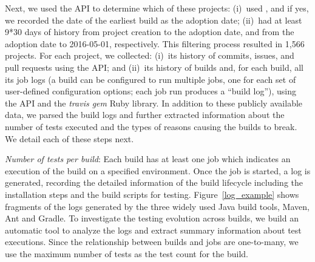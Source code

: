 
Next, we used the \Tvis API to determine which of these projects:
(i)~used \Tvis, and if yes, we recorded the date of the earliest build as the 
adoption date; (ii)~had at least 9*30 days of history from project creation to 
the adoption date, and from the adoption date to 2016-05-01, respectively. 
This filtering process resulted in 1,566 projects.
For each project, we collected: (i)~its history of commits, issues, and pull 
requests using the \GH API; and (ii)~its history of \Tvis builds and, for each
build, all its job logs (a \Tvis build can be configured to run multiple jobs,
one for each set of user-defined configuration options; each job run produces 
a ``build log''), using the \Tvis API and the \textit{travis gem} Ruby library.  
In addition to these publicly available data, we parsed the build logs and 
further extracted information about the number of tests executed and the 
types of reasons causing the builds to break.
We detail each of these steps next.



\emph{Number of tests per build}: 
Each build has at least one job which indicates an execution of the build on a specified environment. Once the job is started, a log is generated, recording the detailed information of the build lifecycle including the installation steps and the build scripts for testing. Figure~\ref{log_example} shows fragments of the logs generated by the three widely used Java build tools, Maven, Ant and Gradle. To investigate the testing evolution across builds, we build an automatic tool to analyze the logs and extract summary information about test executions.  Since the relationship between builds and jobs are one-to-many, we use the maximum number of tests as the test count for the build. 

